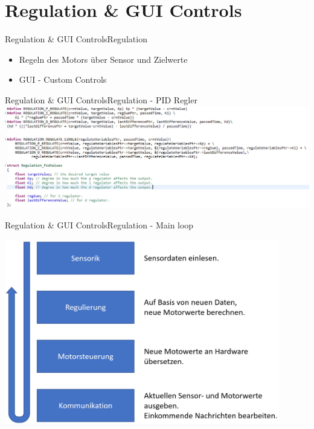 \author{Bernd Krupinski}
\section{Regulation \& GUI Controls}
	
	\begin{frame}{Regulation \& GUI Controls}{Regulation}
	  \begin{itemize}
	    \item Regeln des Motors über Sensor und Zielwerte
	    \item GUI - Custom Controls
	  \end{itemize}
	\end{frame}

	\begin{frame}{Regulation \& GUI Controls}{Regulation - PID Regler}
			\includegraphics[width=1.05\textwidth]{../regulation/PIDRegler.png}
	\end{frame}


	\begin{frame}{Regulation \& GUI Controls}{Regulation - Main loop}
		\begin{center}			
			\includegraphics[width=0.9\textwidth]{../regulation/MainLoop.png}
		\end{center}
	\end{frame}


